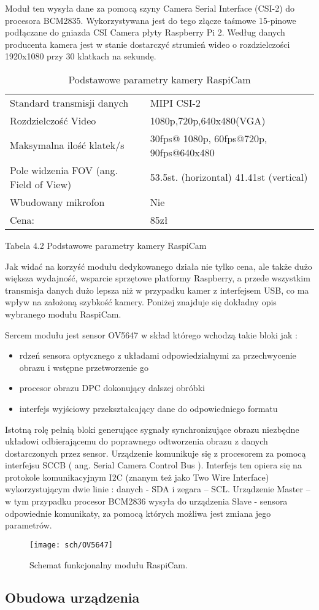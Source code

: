 Moduł ten wysyła dane za pomocą szyny Camera Serial Interface (CSI-2) do procesora BCM2835. Wykorzystywana jest do tego złącze taśmowe 15-pinowe podłączane do gniazda CSI Camera płyty Raspberry Pi 2. Według danych producenta kamera jest w stanie dostarczyć strumień wideo o rozdzielczości 1920x1080 przy 30 klatkach na sekundę.

\begin{table}[hbt!]
\caption[Podstawowe parametry kamery RaspiCam]{Podstawowe parametry kamery RaspiCam}
\begin{tabularx}{\textwidth}{|l|X|} 
 \hline
Standard transmisji danych &	MIPI CSI-2 \\
Rozdzielczość Video &	1080p,720p,640x480(VGA) \\
Maksymalna ilość klatek/s &	30fps@ 1080p, 60fps@720p, 90fps@640x480 \\
Pole widzenia FOV (ang. Field of View) & 53.5st. (horizontal) 41.41st (vertical) \\
Wbudowany mikrofon &	Nie \\
Cena: &	85zł \\
\hline
\end{tabularx}  
\label{tab:compareAnalysers}
\end{table}


Tabela 4.2 Podstawowe parametry kamery RaspiCam

Jak widać na korzyść modułu dedykowanego działa nie tylko cena, ale także dużo większa wydajność, wsparcie sprzętowe platformy Raspberry, a przede wszystkim transmisja danych dużo lepsza niż w przypadku kamer z interfejsem USB, co ma wpływ na założoną szybkość kamery. Poniżej znajduje się dokładny opis wybranego modułu RaspiCam.
\begin{description}
\item Sercem modułu jest sensor OV5647 w skład którego wchodzą takie bloki jak :
\begin{itemize}
\item rdzeń sensora optycznego z układami odpowiedzialnymi za przechwycenie obrazu i wstępne przetworzenie go
\item procesor obrazu DPC dokonujący dalszej obróbki
\item interfejs wyjściowy przekształcający dane do odpowiedniego formatu
\end{itemize}
\end{description}
Istotną rolę pełnią bloki generujące sygnały synchronizujące obrazu niezbędne układowi odbierającemu do poprawnego odtworzenia obrazu z danych dostarczonych przez sensor.
Urządzenie komunikuje się z procesorem za pomocą interfejsu SCCB ( ang. Serial Camera Control Bus ). Interfejs ten opiera się na protokole komunikacyjnym I2C (znanym też jako Two Wire Interface) wykorzystującym dwie linie : danych - SDA i zegara – SCL. Urządzenie Master – w tym przypadku procesor BCM2836 wysyła do urządzenia Slave - sensora odpowiednie komunikaty, za pomocą których możliwa jest zmiana jego parametrów.
 

\begin{figure}[bth]
\centering
{\texttt{[image: sch/OV5647]}}
\caption[Schemat funkcjonalny modułu RaspiCam.]{Schemat funkcjonalny modułu RaspiCam.}
\label{fig:detObj}
\end{figure} 

\subsection{Obudowa urządzenia}

